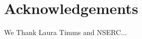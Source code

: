 \documentclass[12pt]{ecology}
\begin{document}





\section*{Acknowledgements}

We Thank Laura Timms and NSERC...



\end{document}
